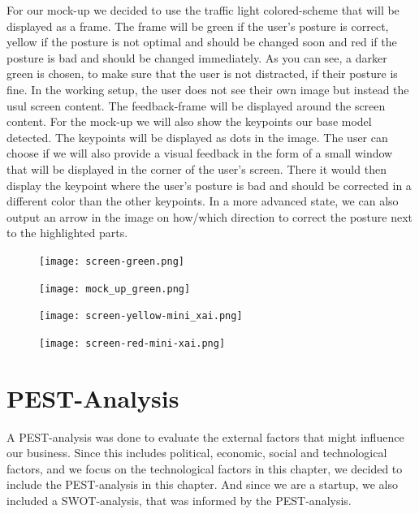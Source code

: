 For our mock-up we decided to use the traffic light colored-scheme that will be displayed as a frame. 
The frame will be green if the user's posture is correct, yellow if the posture is not optimal and should be changed soon and red if the posture is bad and should be changed immediately.
As you can see, a darker green is chosen, to make sure that the user is not distracted, if their posture is fine.
In the working setup, the user does not see their own image but instead the usul screen content. The feedback-frame will be displayed around the screen content. 
For the mock-up we will also show the keypoints our base model detected. The keypoints will be displayed as dots in the image. The user can choose if we will also provide a visual feedback in the form of a small window that will be displayed in the corner of the user's screen.
There it would then display the keypoint where the user's posture is bad and should be corrected in a different color than the other keypoints. 
In a more advanced state, we can also output an arrow in the image on how/which direction to correct the posture next to the highlighted parts.

\begin{figure}[H]
    \centering
    \texttt{[image: screen-green.png]}
\end{figure}

\begin{figure}[H]
    \centering
    \texttt{[image: mock\_up\_green.png]}
\end{figure}

\begin{figure}[H]
    \centering
    \texttt{[image: screen-yellow-mini\_xai.png]}
\end{figure}

\begin{figure}[H]
    \centering
    \texttt{[image: screen-red-mini-xai.png]}
\end{figure}

\section{PEST-Analysis}

A PEST-analysis was done to evaluate the external factors that might influence our business. Since this includes political, economic, social and technological factors, 
and we focus on the technological factors in this chapter, we decided to include the PEST-analysis in this chapter. And since we are a startup, we also included a 
SWOT-analysis, that was informed by the PEST-analysis. 

